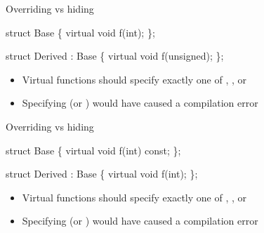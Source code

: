 \begin{frame}[fragile]{Overriding vs hiding \insertcontinuationtext}

  \begin{codeblock}{
struct Base
\{
  virtual void f(\alert{int});
\};

struct Derived : Base
\{
  virtual void f(\alert{unsigned}); 
\};

}\end{codeblock}

  \begin{itemize}
  \item<9-> Virtual functions should specify exactly one of , 
    , or 
  \item<9-> Specifying  (or ) would have caused
    a compilation error
  \end{itemize}

\end{frame}

\begin{frame}[fragile]{Overriding vs hiding \insertcontinuationtext}

  \begin{codeblock}{
struct Base
\{
    virtual void f(int) \alert{const};
\};

struct Derived : Base
\{
  virtual void f(int); 
\};

}\end{codeblock}

  \begin{itemize}
  \item<4-> Virtual functions should specify exactly one of , 
    , or 
  \item<4-> Specifying  (or ) would have caused
    a compilation error
  \end{itemize}

\end{frame}

